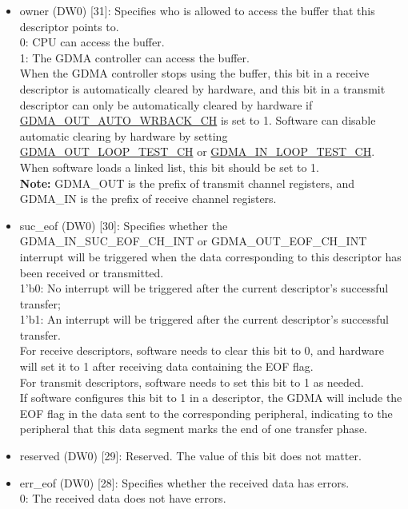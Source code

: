 \documentclass[main\_\_EN.tex]{subfiles}
\begin{document}
\begin{itemize}
    \item owner (DW0) [31]: Specifies who is allowed to access the buffer that this descriptor points to.\\
    0: CPU can access the buffer. \\
    1: The GDMA controller can access the buffer.\\
    When the GDMA controller stops using the buffer, this bit in a receive descriptor is automatically cleared by hardware, and this bit in a transmit descriptor can only be automatically cleared by hardware if \hyperref[fielddesc:GDMAOUTAUTOWRBACKCHN]{GDMA\_OUT\_AUTO\_WRBACK\_CH} is set to 1. Software can disable automatic clearing by hardware by setting \hyperref[fielddesc:GDMAOUTLOOPTESTCHN]{GDMA\_OUT\_LOOP\_TEST\_CH} or \hyperref[fielddesc:GDMAINLOOPTESTCHN]{GDMA\_IN\_LOOP\_TEST\_CH}. When software loads a linked list, this bit should be set to 1.
    \\{\bfseries Note:} GDMA\_OUT is the prefix of transmit channel registers, and GDMA\_IN is the prefix of receive channel registers.
    \item suc\_eof (DW0) [30]: Specifies whether the GDMA\_IN\_SUC\_EOF\_CH\_INT or GDMA\_OUT\_EOF\_CH\_INT interrupt will be triggered when the data corresponding to this descriptor has been received or transmitted.\\
    1'b0: No interrupt will be triggered after the current descriptor's successful transfer;\\
    1'b1: An interrupt will be triggered after the current descriptor's successful transfer.\\
    For receive descriptors, software needs to clear this bit to 0, and hardware will set it to 1 after receiving data containing the EOF flag.\\
    For transmit descriptors, software needs to set this bit to 1 as needed.\\
    If software configures this bit to 1 in a descriptor, the GDMA will include the EOF flag in the data sent to the corresponding peripheral, indicating to the peripheral that this data segment marks the end of one transfer phase.
    \item reserved (DW0) [29]: Reserved. The value of this bit does not matter.
    \item err\_eof (DW0) [28]: Specifies whether the received data has errors.\\
    0: The received data does not have errors.\\

\end{itemize}
\end{document}
